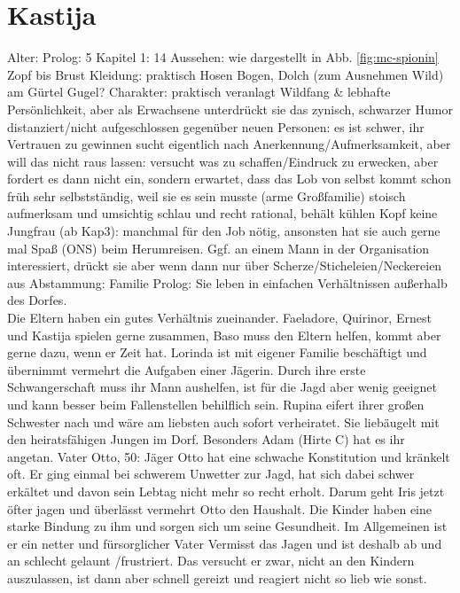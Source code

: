\section{Kastija} \label{sec:mc-spionin}
\begin{outline}
	\1 Alter:
		\2 Prolog: 5
		\2 Kapitel 1: 14
	\1 Aussehen:
		\2 wie dargestellt in Abb. \ref{fig:mc-spionin}
		\2 Zopf bis Brust
	\1 Kleidung:
		\2 praktisch
		\2 Hosen 
		\2 Bogen, Dolch (zum Ausnehmen Wild) am Gürtel
		\2 Gugel?
	\1 Charakter:
		\2 praktisch veranlagt
		\2 Wildfang \& lebhafte Persönlichkeit, aber als Erwachsene unterdrückt sie das
		\2 zynisch, schwarzer Humor
		\2 distanziert/nicht aufgeschlossen gegenüber neuen Personen: es ist schwer, ihr Vertrauen zu gewinnen
		\2 sucht eigentlich nach Anerkennung/Aufmerksamkeit, aber will das nicht raus lassen: versucht was zu schaffen/Eindruck zu erwecken, aber fordert es dann nicht ein, sondern erwartet, dass das Lob von selbst kommt
		\2 schon früh sehr selbstständig, weil sie es sein musste (arme Großfamilie)
		\2 stoisch
		\2 aufmerksam und umsichtig
		\2 schlau und recht rational, behält kühlen Kopf
		\2 keine Jungfrau (ab Kap3): manchmal für den Job nötig, ansonsten hat sie auch gerne mal Spaß (ONS) beim Herumreisen. Ggf. an einem Mann in der Organisation interessiert, drückt sie aber wenn dann nur über Scherze/Sticheleien/Neckereien aus
	\1 Abstammung:
		\2 Familie
			\3 Prolog: Sie leben in einfachen Verhältnissen außerhalb des Dorfes.  \\
			Die Eltern haben ein gutes Verhältnis zueinander. Faeladore, Quirinor, Ernest und Kastija spielen gerne zusammen, Baso muss den Eltern helfen, kommt aber gerne dazu, wenn er Zeit hat. Lorinda ist mit eigener Familie beschäftigt und übernimmt vermehrt die Aufgaben einer Jägerin. Durch ihre erste Schwangerschaft muss ihr Mann aushelfen, ist für die Jagd aber wenig geeignet und kann besser beim Fallenstellen behilflich sein. Rupina eifert ihrer großen Schwester nach und wäre am liebsten auch sofort verheiratet. Sie liebäugelt mit den heiratsfähigen Jungen im Dorf. Besonders Adam (Hirte C) hat es ihr angetan.
		\2 Vater Otto, 50: 
			\3 Jäger
			\3 Otto hat eine schwache Konstitution und kränkelt oft. Er ging einmal bei schwerem Unwetter zur Jagd, hat sich dabei schwer erkältet und davon sein Lebtag nicht mehr so recht erholt. Darum geht Iris jetzt öfter jagen und überlässt vermehrt Otto den Haushalt. 
			\3 Die Kinder haben eine starke Bindung zu ihm und sorgen sich um seine Gesundheit. Im Allgemeinen ist er ein netter und fürsorglicher Vater
			\3 Vermisst das Jagen und ist deshalb ab und an schlecht gelaunt /frustriert. Das versucht er zwar, nicht an den Kindern auszulassen, ist dann aber schnell gereizt und reagiert nicht so lieb wie sonst. 

\end{outline}
